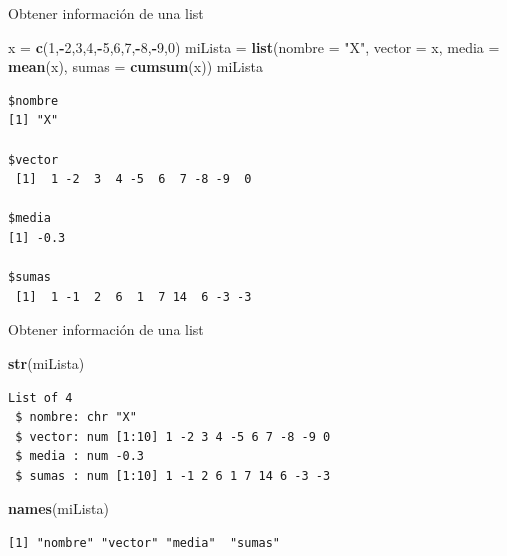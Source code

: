 \documentclass[
  ignorenonframetext,
]{beamer}
\newenvironment{Shaded}{\begin{snugshade}}{\end{snugshade}}
\newcommand{\AttributeTok}[1]{\textcolor[rgb]{0.13,0.29,0.53}{#1}}
\newcommand{\DecValTok}[1]{\textcolor[rgb]{0.00,0.00,0.81}{#1}}
\newcommand{\FunctionTok}[1]{\textcolor[rgb]{0.13,0.29,0.53}{\textbf{#1}}}
\newcommand{\NormalTok}[1]{#1}
\newcommand{\OtherTok}[1]{\textcolor[rgb]{0.56,0.35,0.01}{#1}}
\newcommand{\SpecialCharTok}[1]{\textcolor[rgb]{0.81,0.36,0.00}{\textbf{#1}}}
\newcommand{\StringTok}[1]{\textcolor[rgb]{0.31,0.60,0.02}{#1}}
\begin{document}
\begin{frame}[fragile]{Obtener información de una list}
\label{obtener-informaciuxf3n-de-una-list-1}
\begin{Shaded}
\begin{Highlighting}[]
\NormalTok{x }\OtherTok{=} \FunctionTok{c}\NormalTok{(}\DecValTok{1}\NormalTok{,}\SpecialCharTok{{-}}\DecValTok{2}\NormalTok{,}\DecValTok{3}\NormalTok{,}\DecValTok{4}\NormalTok{,}\SpecialCharTok{{-}}\DecValTok{5}\NormalTok{,}\DecValTok{6}\NormalTok{,}\DecValTok{7}\NormalTok{,}\SpecialCharTok{{-}}\DecValTok{8}\NormalTok{,}\SpecialCharTok{{-}}\DecValTok{9}\NormalTok{,}\DecValTok{0}\NormalTok{)}
\NormalTok{miLista }\OtherTok{=} \FunctionTok{list}\NormalTok{(}\AttributeTok{nombre =} \StringTok{"X"}\NormalTok{, }\AttributeTok{vector =}\NormalTok{ x, }\AttributeTok{media =} \FunctionTok{mean}\NormalTok{(x), }\AttributeTok{sumas =} \FunctionTok{cumsum}\NormalTok{(x))}
\NormalTok{miLista}
\end{Highlighting}
\end{Shaded}

\begin{verbatim}
$nombre
[1] "X"

$vector
 [1]  1 -2  3  4 -5  6  7 -8 -9  0

$media
[1] -0.3

$sumas
 [1]  1 -1  2  6  1  7 14  6 -3 -3
\end{verbatim}
\end{frame}

\begin{frame}[fragile]{Obtener información de una list}
\label{obtener-informaciuxf3n-de-una-list-2}
\begin{Shaded}
\begin{Highlighting}[]
\FunctionTok{str}\NormalTok{(miLista)}
\end{Highlighting}
\end{Shaded}

\begin{verbatim}
List of 4
 $ nombre: chr "X"
 $ vector: num [1:10] 1 -2 3 4 -5 6 7 -8 -9 0
 $ media : num -0.3
 $ sumas : num [1:10] 1 -1 2 6 1 7 14 6 -3 -3
\end{verbatim}

\begin{Shaded}
\begin{Highlighting}[]
\FunctionTok{names}\NormalTok{(miLista)}
\end{Highlighting}
\end{Shaded}

\begin{verbatim}
[1] "nombre" "vector" "media"  "sumas" 
\end{verbatim}
\end{frame}
\end{document}

